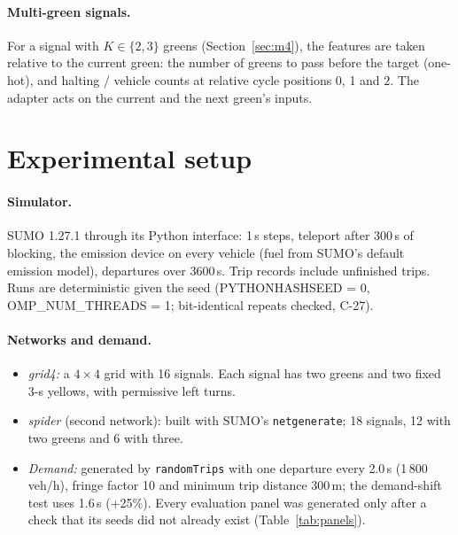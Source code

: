 \documentclass[11pt]{article}
\begin{document}
\paragraph{Multi-green signals.} For a signal with $K\in\{2,3\}$ greens (Section~\ref{sec:m4}), the features are taken relative to the
current green: the number of greens to pass before the target (one-hot), and halting / vehicle counts at relative cycle positions 0, 1 and
2. The adapter acts on the current and the next green's inputs.

\section{Experimental setup}\label{sec:setup}
\paragraph{Simulator.} SUMO 1.27.1 \cite{lopez2018} through its Python interface: 1\,s steps, teleport after 300\,s of blocking, the
emission device on every vehicle (fuel from SUMO's default emission model), departures over 3600\,s. Trip records include unfinished trips.
Runs are deterministic given the seed (PYTHONHASHSEED = 0, OMP\_NUM\_THREADS = 1; bit-identical repeats checked, C-27).
\paragraph{Networks and demand.}
\begin{itemize}\setlength\itemsep{0pt}
\item \emph{grid4:} a $4\times4$ grid with 16 signals. Each signal has two greens and two fixed 3-s yellows, with permissive left turns.
\item \emph{spider} (second network): built with SUMO's \texttt{netgenerate}; 18 signals, 12 with two greens and 6 with three.
\item \emph{Demand:} generated by \texttt{randomTrips} with one departure every 2.0\,s (1\,800\,veh/h), fringe factor 10 and minimum trip
distance 300\,m; the demand-shift test uses 1.6\,s (+25\%). Every evaluation panel was generated only after a check that its seeds did not
already exist (Table~\ref{tab:panels}).
\end{itemize}
\end{document}
